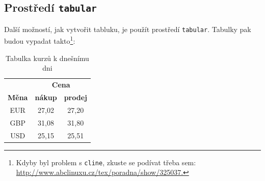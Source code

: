 \documentclass[11pt, a4paper]{article}
\begin{document}
\subsection{Prostředí \texttt{tabular}}
Další možností, jak vytvořit tabluku, je použít prostředí \verb|tabular|. Tabulky pak budou vypadat takto\footnote{Kdyby byl problem s \texttt{cline}, zkuste se podívat třeba sem: \url{http://www.abclinuxu.cz/tex/poradna/show/325037.}}:\\
\shorthandoff{-}
\begin{table}[h]
    \begin{center}
        \begin{tabular}{|c|c|c|} \hline
                & \multicolumn{2}{c|}{\textbf{Cena}} \\ \cline{2-3}
                \textbf{Měna} & \textbf{nákup} & \textbf{prodej} \\ \hline
                EUR & 27,02 & 27,20 \\
                GBP & 31,08 & 31,80 \\
                USD & 25,15 & 25,51 \\
                \hline
        \end{tabular}
    \caption{Tabulka kurzů k dnešnímu dni}\label{tab_1}
    \end{center}
\end{table}
\end{document}
